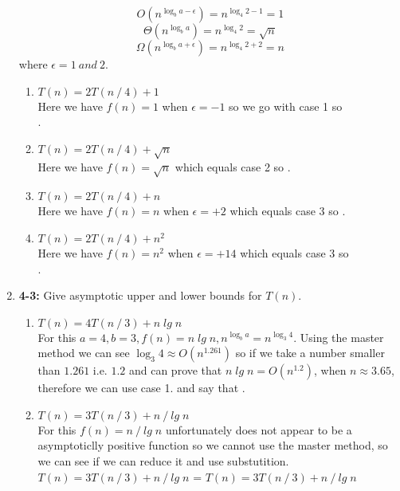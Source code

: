 \documentclass{article}
\begin{document}
\begin{enumerate}
    \[O(n^{\log_b a-\epsilon}) = n^{\log_4 2-1} = 1\]
    \[\Theta(n^{\log_b a}) = n^{\log_4 2} = \sqrt{n}\] 
    \[\Omega(n^{\log_b a+\epsilon}) = n^{\log_4 2+2} = n\]
    where $\epsilon = 1\:and\:2$.
    \begin{enumerate}
      \itemsep1em 
      \item $T(n) = 2T(n \mathbin{/} 4) + 1$ \\
      Here we have $f(n) = 1$ when $\epsilon = -1$ so we go with case 1 so \\ .
      \item $T(n) = 2T(n \mathbin{/} 4) + \sqrt{n}$ \\
      Here we have $f(n) = \sqrt{n}$ which equals case 2 so .
      \item $T(n) = 2T(n \mathbin{/} 4) + n$ \\
      Here we have $f(n) = n$ when $\epsilon = +2$ which equals case 3 so . 
      \item $T(n) = 2T(n \mathbin{/} 4) + n^2$ \\
      Here we have $f(n) = n^2$ when $\epsilon = +14$ which equals case 3 so \\ .
    \end{enumerate}

    \item \textbf{4-3:} Give asymptotic upper and lower bounds for $T(n)$.
    \begin{enumerate}
      \itemsep1em 
      \item $T(n) = 4T(n \mathbin{/} 3) + n\;lg\;n$ \\
      For this $a = 4, b = 3, f(n) = n\;lg\;n, n^{\log_b a} = n^{\log_3 4}$. Using the master method we can see $\log_3 4 \approx O(n^{1.261})$ 
      so if we take a number smaller than $1.261$ i.e. $1.2$ and can prove that $n\;lg\;n = O(n^{1.2})$, when $n \approx 3.65$, therefore we can use case 1.
      and say that .

      \item $T(n) = 3T(n \mathbin{/} 3) + n \mathbin{/} lg\;n$ \\
      For this $f(n) = n \mathbin{/} lg\;n$ unfortunately does not appear to be a asymptoticlly positive function so we cannot use the master method, so we can see if we can reduce it and use substutition.
      $T(n) = 3T(n \mathbin{/} 3) + n \mathbin{/} lg\;n$ = $T(n) = 3T(n \mathbin{/} 3) + n \mathbin{/} lg\;n$


\end{enumerate}
\end{enumerate}
\end{document}
